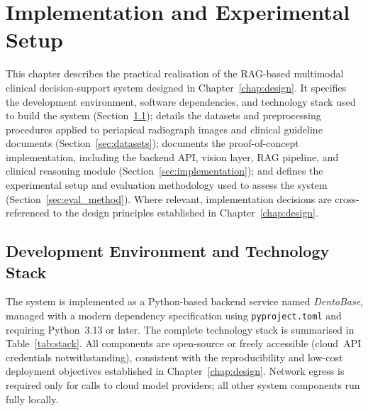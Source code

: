 \documentclass[12pt,a4paper]{report}
\begin{document}
	
	
	\chapter{Implementation and Experimental Setup}
	\label{chap:implementation}
	
	This chapter describes the practical realisation of the RAG-based
	multimodal clinical decision-support system designed in Chapter~\ref{chap:design}.
	It specifies the development environment, software dependencies, and
	technology stack used to build the system (Section~\ref{sec:stack});
	details the datasets and preprocessing procedures applied to periapical
	radiograph images and clinical guideline documents
	(Section~\ref{sec:datasets}); documents the proof-of-concept
	implementation, including the backend API, vision layer, RAG pipeline,
	and clinical reasoning module (Section~\ref{sec:implementation}); and
	defines the experimental setup and evaluation methodology used to assess
	the system (Section~\ref{sec:eval_method}).  Where relevant,
	implementation decisions are cross-referenced to the design principles
	established in Chapter~\ref{chap:design}.
	
	\section{Development Environment and Technology Stack}
	\label{sec:stack}
	
	The system is implemented as a Python-based backend service named
	\textit{DentoBase}, managed with a modern dependency specification using
	\texttt{pyproject.toml} and requiring Python~3.13 or later.  The
	complete technology stack is summarised in Table~\ref{tab:stack}.  All
	components are open-source or freely accessible (cloud~API credentials
	notwithstanding), consistent with the reproducibility and low-cost
	deployment objectives established in Chapter~\ref{chap:design}.  Network egress is
	required only for calls to cloud model providers; all other system
	components run fully locally.
	
\end{document}
